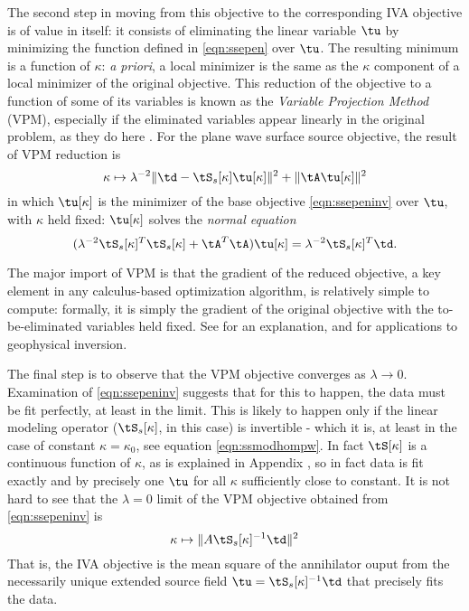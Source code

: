 The second step in moving from this objective to the corresponding IVA
objective is of value in itself: it consists of eliminating the linear
variable $\tu$ by minimizing the function defined in \ref{eqn:ssepen}
over $\tu$. The resulting minimum is a function of $\kappa$: {\em a
  priori}, a local minimizer is the same as the $\kappa$ component of
a local minimizer of the original objective. This reduction of the
objective to a function of some of its variables is known as the {\em
  Variable Projection Method} (VPM), especially if the eliminated variables
appear linearly in the original problem, as they do here
\cite[]{GolubPereyra:03}. For the plane wave surface source objective,
the result of VPM reduction is
\begin{equation}
  \label{eqn:ssevpm}
  \kappa \mapsto \lambda^{-2}\|\td-\tS_s[\kappa]\tu[\kappa]\|^2 + \|\tA\tu[\kappa]\|^2
\end{equation}
in which $\tu[\kappa]$ is the minimizer of the base objective
\ref{eqn:ssepeninv} over $\tu$, with $\kappa$ held fixed:
$\tu[\kappa]$ solves the {\em normal equation}
\begin{equation}
  \label{eqn:ssenorm}
  (\lambda^{-2}\tS_s[\kappa]^T\tS_s[\kappa] +
  \tA^T\tA)\tu[\kappa]=\lambda^{-2}\tS_s[\kappa]^T\td.
\end{equation}

The major import of VPM is that the gradient
of the reduced objective, a key element in any calculus-based
optimization algorithm, is relatively simple to compute: formally, it
is simply the gradient of the original objective with the
to-be-eliminated variables held fixed. See \cite{GolubPereyra:03} for
an explanation, and
\cite{vanLeeuwenMulder:09,Rickett:SEG12,LiRickettAbubakar:13} for
applications to geophysical inversion.

The final step is to observe that the VPM objective converges as
$\lambda \rightarrow 0$. Examination of \ref{eqn:ssepeninv} suggests
that for this to happen, the data must be fit perfectly, at least in
the limit. This is likely to happen only if the linear modeling
operator ($\tS_s[\kappa]$, in this case) is invertible - which it is,
at least in the case of constant $\kappa=\kappa_0$,
see equation \ref{eqn:ssmodhompw}.  In fact $\tS[\kappa]$ is a
continuous function of $\kappa$, as is explained in Appendix \appSingular, so in fact data is fit exactly and by precisely one $\tu$ for
all $\kappa$ sufficiently close to constant. It is not hard to see that the
$\lambda = 0$ limit of the VPM objective obtained from 
\ref{eqn:ssepeninv} is
\begin{equation}
  \label{eqn:ssiva}
  \kappa \mapsto \|A \tS_s[\kappa]^{-1}\td\|^2
\end{equation}
That is, the IVA objective is the mean square of the annihilator ouput
from the necessarily unique extended source field $\tu =
\tS_s[\kappa]^{-1}\td$ that precisely fits the data.

